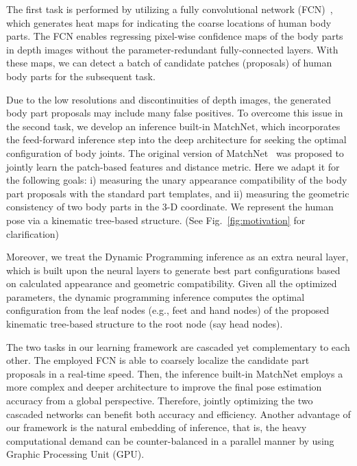 \documentclass{sig-alternate-05-2015}
\begin{document}
The first task is performed by utilizing a fully convolutional network (FCN)~\cite{fullconv}, which generates heat maps for indicating the coarse locations of human body parts. The FCN enables regressing pixel-wise confidence maps of the body parts in depth images without the parameter-redundant fully-connected layers. With these maps, we can detect a batch of candidate patches (proposals) of human body parts for the subsequent task. 

Due to the low resolutions and discontinuities of depth images, the generated body part proposals may include many false positives. To overcome this issue in the second task, we develop an inference built-in MatchNet, which incorporates the feed-forward inference step into the deep architecture for seeking the optimal configuration of body joints. The original version of MatchNet~\cite{mn15cvpr} was proposed to jointly learn the patch-based features and distance metric. Here we adapt it for the following goals: i) measuring the unary appearance compatibility of the body part proposals with the standard part templates, and ii) measuring the geometric consistency of two body parts in the 3-D coordinate. We represent the human pose via a kinematic tree-based structure. (See Fig.~\ref{fig:motivation} for clarification)

Moreover, we treat the Dynamic Programming inference as an extra neural layer, which is built upon the neural layers to generate best part configurations based on calculated appearance and geometric compatibility. Given all the optimized parameters, the dynamic programming inference computes the optimal configuration from the leaf nodes (e.g., feet and hand nodes) of the proposed kinematic tree-based structure to the root node (say head nodes).


The two tasks in our learning framework are cascaded yet complementary to each other. The employed FCN is able to coarsely localize the candidate part proposals in a real-time speed. Then, the inference built-in MatchNet employs a more complex and deeper architecture to improve the final pose estimation accuracy from a global perspective. Therefore, jointly optimizing the two cascaded networks can benefit both accuracy and efficiency. Another advantage of our framework is the natural embedding of inference, that is, the heavy computational demand can be counter-balanced in a parallel manner by using Graphic Processing Unit (GPU).
\end{document}
